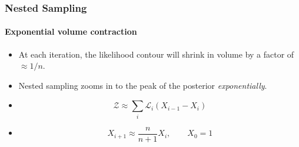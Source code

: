 \documentclass[]{beamer}
\newcommand{\lik}{\mathcal{L}}
\newcommand{\ev}{\mathcal{Z}}
\begin{document}
\begin{frame}
  \frametitle{Nested Sampling} 
  \framesubtitle{Exponential volume contraction} 
  
  \begin{itemize}
      \pause
    \item At each iteration, the likelihood contour will shrink in volume by a factor of $\approx 1/n$.
      \pause
    \item Nested sampling zooms in to the peak of the posterior {\em exponentially}.
      \pause
    \item 
      \begin{equation}
        \ev \approx \sum_i \lik_i (X_{i-1} - X_{i})
      \end{equation}
      \pause
    \item 
      \begin{equation}
        X_{i+1} \approx \frac{n}{n+1}X_i, \qquad X_{0} = 1
      \end{equation}
  \end{itemize}
  
\end{frame}

%
% 
%
%
%
%
%
\end{document}
